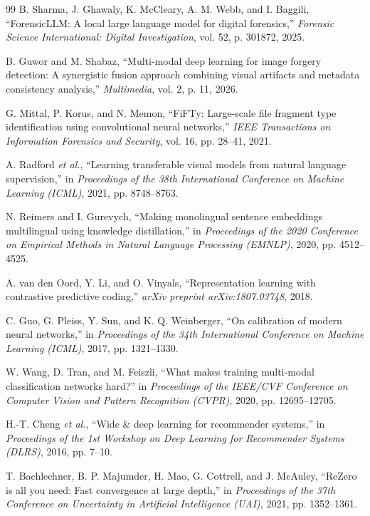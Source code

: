 \documentclass[conference]{IEEEtran}
\begin{document}
\begin{thebibliography}{99}
 B. Sharma, J. Ghawaly, K. McCleary, A. M. Webb, and I. Baggili, ``ForensicLLM: A local large
language model for digital forensics,'' \emph{Forensic Science International: Digital Investigation}, vol. 52, p.
301872, 2025.

 B. Guwor and M. Shabaz, ``Multi-modal deep learning for image forgery detection: A synergistic
fusion approach combining visual artifacts and metadata consistency analysis,'' \emph{Multimedia}, vol. 2, p. 11,
2026.

 G. Mittal, P. Korus, and N. Memon, ``FiFTy: Large-scale file fragment type identification
using convolutional neural networks,'' \emph{IEEE Transactions on Information Forensics and Security}, vol. 16, pp.
28--41, 2021.

 A. Radford \emph{et al.}, ``Learning transferable visual models from natural language supervision,''
in \emph{Proceedings of the 38th International Conference on Machine Learning (ICML)}, 2021, pp. 8748--8763.

 N. Reimers and I. Gurevych, ``Making monolingual sentence embeddings multilingual using knowledge
distillation,'' in \emph{Proceedings of the 2020 Conference on Empirical Methods in Natural Language Processing
(EMNLP)}, 2020, pp. 4512--4525.

 A. van den Oord, Y. Li, and O. Vinyals, ``Representation learning with contrastive predictive
coding,'' \emph{arXiv preprint arXiv:1807.03748}, 2018.

 C. Guo, G. Pleiss, Y. Sun, and K. Q. Weinberger, ``On calibration of modern neural networks,'' in
\emph{Proceedings of the 34th International Conference on Machine Learning (ICML)}, 2017, pp. 1321--1330.

 W. Wang, D. Tran, and M. Feiszli, ``What makes training multi-modal classification networks
hard?'' in \emph{Proceedings of the IEEE/CVF Conference on Computer Vision and Pattern Recognition (CVPR)}, 2020,
pp. 12695--12705.

 H.-T. Cheng \emph{et al.}, ``Wide \& deep learning for recommender systems,'' in
\emph{Proceedings of the 1st Workshop on Deep Learning for Recommender Systems (DLRS)}, 2016, pp. 7--10.

 T. Bachlechner, B. P. Majumder, H. Mao, G. Cottrell, and J. McAuley, ``ReZero is all you
need: Fast convergence at large depth,'' in \emph{Proceedings of the 37th Conference on Uncertainty in Artificial
Intelligence (UAI)}, 2021, pp. 1352--1361.


\end{thebibliography}
\end{document}
